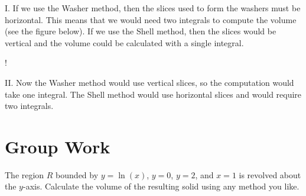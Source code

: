 \documentclass[]{ximera}
\begin{document}
\begin{freeResponse}
I. If we use the Washer method, then the slices used to form the washers must be horizontal. This means that we would need two integrals to compute the volume (see the figure below). If we use the Shell method, then the slices would be vertical and the volume could be calculated with a single integral.

\begin{center}
\resizebox {6cm} {!} {
}
	\end{center}
	
	II. Now the Washer method would use vertical slices, so the computation would take one integral. The Shell method would use horizontal slices and would require two integrals.

\end{freeResponse}



\section{Group Work}

\begin{problem}
The region $R$ bounded by $y=\ln(x)$, $y=0$, $y=2$, and $x=1$ is revolved about the $y$-axis. Calculate the volume of the resulting solid using any method you like.
\end{problem}
\end{document}
